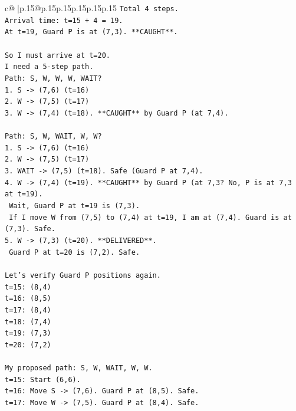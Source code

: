 \documentclass{article}
\begin{document}
{\begin{supertabular}{c@{$\;$}|p{.15\linewidth}@{}p{.15\linewidth}p{.15\linewidth}p{.15\linewidth}p{.15\linewidth}p{.15\linewidth}}
{{{\texttt{Total 4 steps.} \\
\texttt{Arrival time: t=15 + 4 = 19.} \\
\texttt{At t=19, Guard P is at (7,3). **CAUGHT**.} \\
\\ 
\texttt{So I must arrive at t=20.} \\
\texttt{I need a 5{-}step path.} \\
\texttt{Path: S, W, W, W, WAIT?} \\
\texttt{1. S {-}> (7,6) (t=16)} \\
\texttt{2. W {-}> (7,5) (t=17)} \\
\texttt{3. W {-}> (7,4) (t=18). **CAUGHT** by Guard P (at 7,4).} \\
\\ 
\texttt{Path: S, W, WAIT, W, W?} \\
\texttt{1. S {-}> (7,6) (t=16)} \\
\texttt{2. W {-}> (7,5) (t=17)} \\
\texttt{3. WAIT {-}> (7,5) (t=18). Safe (Guard P at 7,4).} \\
\texttt{4. W {-}> (7,4) (t=19). **CAUGHT** by Guard P (at 7,3? No, P is at 7,3 at t=19).} \\
\texttt{   Wait, Guard P at t=19 is (7,3).} \\
\texttt{   If I move W from (7,5) to (7,4) at t=19, I am at (7,4). Guard is at (7,3). Safe.} \\
\texttt{5. W {-}> (7,3) (t=20). **DELIVERED**.} \\
\texttt{   Guard P at t=20 is (7,2). Safe.} \\
\\ 
\texttt{Let's verify Guard P positions again.} \\
\texttt{t=15: (8,4)} \\
\texttt{t=16: (8,5)} \\
\texttt{t=17: (8,4)} \\
\texttt{t=18: (7,4)} \\
\texttt{t=19: (7,3)} \\
\texttt{t=20: (7,2)} \\
\\ 
\texttt{My proposed path: S, W, WAIT, W, W.} \\
\texttt{t=15: Start (6,6).} \\
\texttt{t=16: Move S {-}> (7,6). Guard P at (8,5). Safe.} \\
\texttt{t=17: Move W {-}> (7,5). Guard P at (8,4). Safe.} \\
}}}
\end{supertabular}}
\end{document}
